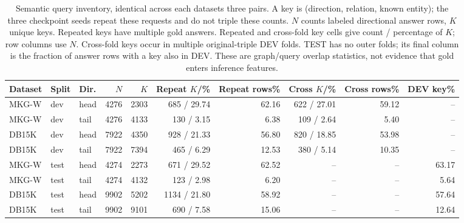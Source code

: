 \begin{table}[htbp]
\centering\footnotesize\setlength{\tabcolsep}{3pt}
\caption{Semantic query inventory, identical across each dataset\textquotesingle s three pairs. A key is (direction, relation, known entity); the three checkpoint seeds repeat these requests and do not triple these counts. $N$ counts labeled directional answer rows, $K$ unique keys. Repeated keys have multiple gold answers. Repeated and cross-fold key cells give count / percentage of $K$; row columns use $N$. Cross-fold keys occur in multiple original-triple DEV folds. TEST has no outer folds; its final column is the fraction of answer rows with a key also in DEV. These are graph/query overlap statistics, not evidence that gold enters inference features.}
\label{tab:query-inventory}
\begin{tabular}{lllrrrrrrr}
\toprule
Dataset & Split & Dir. & $N$ & $K$ & Repeat $K$/\% & Repeat rows\% & Cross $K$/\% & Cross rows\% & DEV key\%\\
\midrule
MKG-W & dev & head & 4276 & 2303 & 685 / 29.74 & 62.16 & 622 / 27.01 & 59.12 & --\\
MKG-W & dev & tail & 4276 & 4133 & 130 / 3.15 & 6.38 & 109 / 2.64 & 5.40 & --\\
DB15K & dev & head & 7922 & 4350 & 928 / 21.33 & 56.80 & 820 / 18.85 & 53.98 & --\\
DB15K & dev & tail & 7922 & 7394 & 465 / 6.29 & 12.53 & 380 / 5.14 & 10.35 & --\\
MKG-W & test & head & 4274 & 2273 & 671 / 29.52 & 62.52 & -- & -- & 63.17\\
MKG-W & test & tail & 4274 & 4132 & 123 / 2.98 & 6.20 & -- & -- & 5.64\\
DB15K & test & head & 9902 & 5202 & 1134 / 21.80 & 58.92 & -- & -- & 57.64\\
DB15K & test & tail & 9902 & 9101 & 690 / 7.58 & 15.06 & -- & -- & 12.64\\
\bottomrule
\end{tabular}
\end{table}
